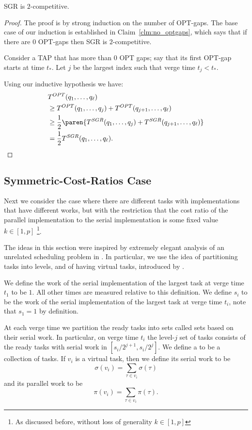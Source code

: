 \begin{proposition}
  \label{prop:2competitive}
  SGR is $2$-competitive.
\end{proposition}
\begin{proof}
  The proof is by strong induction on the number of OPT-gaps. 
  The base case of our induction is established in
  Claim~\ref{clm:no_optgaps}, which says that if there are $0$
  OPT-gaps then SGR is $2$-competitive. 

  Consider a TAP that has more than $0$ OPT gaps;
  say that its first OPT-gap starts at time $t_*$.
  Let $j$ be the largest index such that verge time $t_j <
  t_*$.

  Using our inductive hypothesis we have:
  \begin{align*}
  &T^{OPT}(q_1, \ldots, q_\ell) \\
  &\ge T^{OPT}(q_1, \ldots, q_j) + T^{OPT}(q_{j+1}, \ldots, q_{\ell})\\
  &\ge \frac{1}{2}\paren{T^{SGR}(q_1, \ldots, q_j) + T^{SGR}(q_{j+1}, \ldots, q_{\ell})}\\
  &=\frac{1}{2} T^{SGR}(q_1, \ldots, q_\ell).
  \end{align*}

\end{proof}

\subsection{Symmetric-Cost-Ratios Case}
\label{subsec:symmetriccostratio}
Next we consider the case where there are different tasks with
implementations that have different works, but with the
restriction that the cost ratio of the parallel implementation to
the serial implementation is some fixed value $k \in [1,p]$
\footnote{As discussed before, without loss of generality $k\in
[1,p]$}.

The ideas in this section were inspired by extremely elegant
analysis of an unrelated scheduling problem in \cite{bd20}. In
particular, we use the idea of partitioning tasks into levels,
and of having virtual tasks, introduced by \cite{bd20}.

We define the work of the serial implementation of the largest
task at verge time $t_1$  to be $1$. All other times are measured
relative to this definition. We define $s_i$ to be the work of
the serial implementation of the largest task at verge time
$t_i$, note that $s_1 = 1$ by definition. 

At each verge time we partition the ready tasks into
sets called  sets based on their serial work. In
particular, on verge time $t_i$ the level-$j$ set of tasks consists of 
the ready tasks with serial work in $[s_i/2^{j+1}, s_i/2^{j}]$.
We define a  to be a collection of tasks.
If $v_i$ is a virtual task, then we define its serial work to be
$$\sigma(v_i) = \sum_{\tau \in v_i} \sigma(\tau)$$ and 
its parallel work to be 
$$\pi(v_i) = \sum_{\tau \in v_i} \pi(\tau).$$

